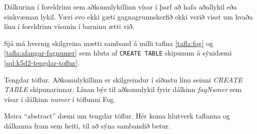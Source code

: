 Dálkurinn í foreldrinu sem aðkomulykillinn vísar í þarf að hafa aðallykil eða einkvæman lykil. Væri svo ekki gæti gagnagrunnskerfið ekki verið visst um hvaða línu í foreldrinu vísunin í barninu ætti við.

Sjá má hvernig skilgreina mætti samband á milli taflna \ref{tafla:fog} og \ref{tafla:afangar-fagnumer} sem hluta af \verb|CREATE TABLE| skipunum á sýnidæmi \ref{sql:k5d2-tengdar-toflur}.

\begin{example}
\caption[FOREIGN KEY - tengdar töflur]{Tengdar töflur. Aðkomulykillinn er skilgreindur í síðustu línu seinni \emph{CREATE TABLE} skipunarinnar. Línan býr til aðkomulykil fyrir dálkinn \emph{fagNumer} sem vísar í dálkinn \emph{numer} í töflunni Fog.}
\label{sql:k5d2-tengdar-toflur}
\centering
{}
\end{example}

\begin{example}
\caption[FOREIGN KEY - abstract dæmi]{Meira ``abstract'' dæmi um tengdar töflur. Hér koma hlutverk taflanna og dálkanna fram sem heiti, til að sýna sambandið betur.}
\label{sql:k5d3-abstract-toflur}
\centering
{}
\end{example}








